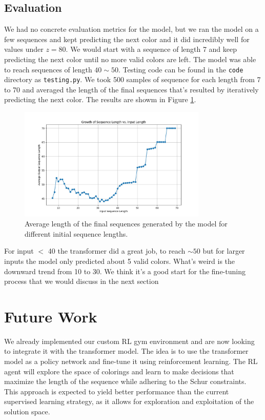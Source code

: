 \documentclass[12pt]{article}
\begin{document}
\subsection{Evaluation}
We had no concrete evaluation metrics for the model, but we ran the model on a few sequences and kept predicting the next color and it did incredibly well for values under $z = 80$. We would start with a sequence of length 7 and keep predicting the next color until no more valid colors are left. The model was able to reach sequences of length $40\sim50$. Testing code can be found in the \texttt{code} directory as \texttt{testing.py}.
We took 500 samples of sequence for each length from 7 to 70 and averaged the length of the final sequences that's resulted by iteratively predicting the next color. The results are showm in Figure \ref{fig:results}. 
\begin{figure}[h]
    \centering
    \includegraphics[width=0.8\textwidth]{../code/sequence_growth_plot.png}
    \caption{Average length of the final sequences generated by the model for different initial sequence lengths.}
    \label{fig:results}
\end{figure}
For input $<$ 40 the transformer did a great job, to reach $\sim 50$ but for larger inputs the model only predicted about 5 valid colors. What's weird is the downward trend from 10 to 30. 
We think it's a good start for the fine-tuning process that we would discuss in the next section

\section{Future Work}
We already implemented our custom RL gym environment and are now looking to integrate it with the transformer model. The idea is to use the transformer model as a policy network and fine-tune it using reinforcement learning. The RL agent will explore the space of colorings and learn to make decisions that maximize the length of the sequence while adhering to the Schur constraints. This approach is expected to yield better performance than the current supervised learning strategy, as it allows for exploration and exploitation of the solution space. 
\end{document}
